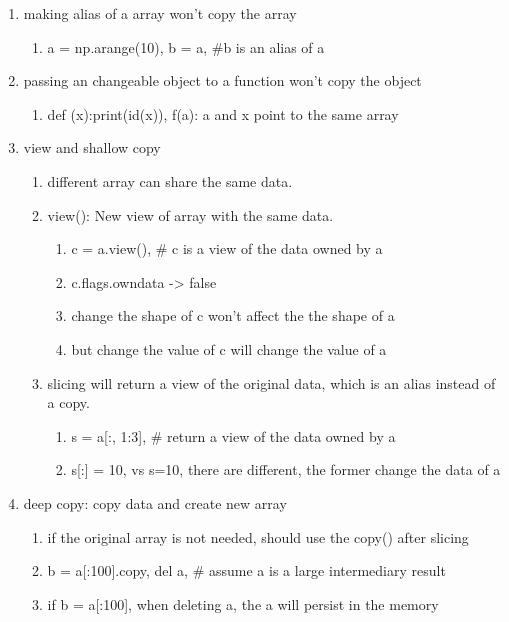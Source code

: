 \documentclass[11pt]{article}
\begin{document}
\begin{enumerate}
\item making alias of a array won't copy the array
\label{sec:org008d50e}
\begin{enumerate}
\item a = np.arange(10), b = a, \#b is an alias of a
\label{sec:org991dabb}
\end{enumerate}
\item passing an changeable object to a function won't copy the object
\label{sec:orgbd0ffac}
\begin{enumerate}
\item def (x):print(id(x)), f(a):  a and x point to the same array
\label{sec:org59ead7e}
\end{enumerate}
\item view and shallow copy
\label{sec:org1057bd0}
\begin{enumerate}
\item different array can share the same data.
\label{sec:org8c9ffad}
\item view(): New view of array with the same data.
\label{sec:org57e2d01}
\begin{enumerate}
\item c = a.view(), \# c is a view of the data owned by a
\label{sec:org29f6046}
\item c.flags.owndata -> false
\label{sec:org9addfa6}
\item change the shape of c won't affect the the shape of a
\label{sec:orgc8e025c}
\item but change the value of c will change the value of a
\label{sec:orgc2beec6}
\end{enumerate}
\item slicing will return a view of the original data, which is an alias instead of a copy.
\label{sec:orgb151429}
\begin{enumerate}
\item s = a[:, 1:3], \# return a view of the data owned by a
\label{sec:org943bb15}
\item s[:] = 10, vs s=10, there are different, the former change the data of a
\label{sec:org7f703f2}
\end{enumerate}
\end{enumerate}
\item deep copy: copy data and create new array
\label{sec:org94b1c06}
\begin{enumerate}
\item if the original array is not needed, should use the copy() after slicing
\label{sec:org80c2c8f}
\item b = a[:100].copy, del a, \# assume a is a large intermediary result
\label{sec:org309fbc7}
\item if b = a[:100], when deleting a, the a will persist in the memory
\label{sec:org1907af5}
\end{enumerate}
\end{enumerate}
\end{document}
